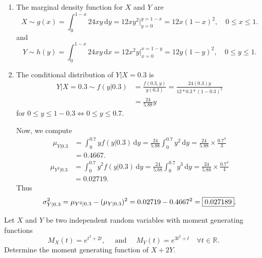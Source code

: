 \begin{mdframed}
\begin{Answer}
\begin{enumerate}
            \item The marginal density function for $X$ and $Y$ are
            \[
                X \sim g(x) = \int^{1-x}_0 24xy \, \mathrm{d}y=
                12xy^2 \bigg \vert^{y=1-x}_{y=0} = 12x(1-x)^2,\quad 0 \leq x \leq 1.
            \]
            and
            \[
                Y \sim h(y) = \int^{1-x}_0 24xy \, \mathrm{d}x =
                12x^2y \bigg \vert^{x=1-y}_{x=0} = 12y(1-y)^2, \quad 0 \leq y \leq 1.
            \]

            \item The conditional distribution of $Y | X = 0.3$ is
            \begin{align*}
                Y | X = 0.3 \sim f(y|0.3) &= \frac{f(0.3, y)}{g(0.3)}
                = \frac{24(0.3)y}{12 * 0.3 * (1-0.3)^2}\\
                &= \frac{24}{5.88}y
            \end{align*}
            for $0 \leq y \leq 1 - 0.3 \iff 0 \leq y \leq 0.7$.

            Now, we compute
            \begin{align*}
                \mu_{Y|0.3} &= \int^{0.7}_{0} y f(y|0.3) \, \mathrm{d}y
                = \frac{24}{5.88} \int^{0.7}_{0} y^2 \, \mathrm{d}y
                = \frac{24}{5.88} \times \frac{0.7^3}{3}\\
                &=0.4667.
            \end{align*}
            \begin{align*}
                \mu_{Y^2|0.3} &= \int^{0.7}_{0} y^2 f(y|0.3) \, \mathrm{d}y
                = \frac{24}{5.88} \int^{0.7}_{0} y^3 \, \mathrm{d}y
                = \frac{24}{5.88} \times \frac{0.7^4}{4}\\
                &=0.02719.
            \end{align*}
            Thus
            \[
                \sigma^2_{Y|0.3} = \mu_{Y^2|0.3} - (\mu_{Y|0.3})^2 = 0.02719 - 0.4667^2 
                = \fbox{$0.027189$}.
            \]
        \end{enumerate}
    \end{Answer}

    \begin{Exercise}
        Let $X$ and $Y$ be two independent random variables with moment generating functions
        \[
            M_X(t) = e^{t^2 + 2t}, \quad \text{ and } \quad M_Y(t) = e^{3t^2 + t} \quad \forall t \in \mathbb{R}.
        \]
        Determine the moment generating function of $X + 2Y$.
    \end{Exercise}


\end{mdframed}

